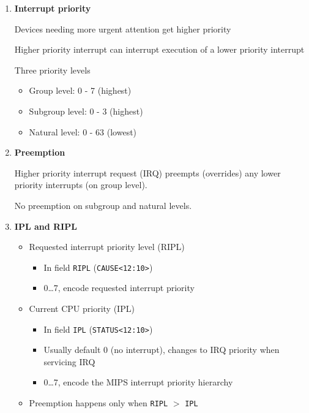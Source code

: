 \documentclass[a4paper]{article}
\begin{document}
\begin{enumerate}[label = \arabic*.]
    \item \textbf{Interrupt priority}
      \par Devices needing more urgent attention get higher priority
      \par Higher priority interrupt can interrupt execution of a lower priority interrupt

      \par Three priority levels
      \begin{itemize}[leftmargin = 1cm]
        \item Group level: 0 - 7 (highest)
        \item Subgroup level: 0 - 3 (highest)
        \item Natural level: 0 - 63 (lowest)
      \end{itemize}

    \item \textbf{Preemption}
      \par Higher priority interrupt request (IRQ) preempts (overrides) any lower priority interrupts (on group level).
      \par No preemption on subgroup and natural levels.

    \item \textbf{IPL and RIPL}
      \begin{itemize}[leftmargin = 1cm]
        \item Requested interrupt priority level (RIPL)
          \begin{itemize}[leftmargin = 1cm]
            \item In field \verb|RIPL| (\verb|CAUSE<12:10>|)
            \item 0\ldots 7, encode requested interrupt priority
          \end{itemize}
        \item Current CPU priority (IPL)
          \begin{itemize}[leftmargin = 1cm]
            \item In field \verb|IPL| (\verb|STATUS<12:10>|)
            \item Usually default 0 (no interrupt), changes to IRQ priority when servicing IRQ
            \item 0\ldots 7, encode the MIPS interrupt priority hierarchy
          \end{itemize}
        \item Preemption happens only when \verb|RIPL| \( > \) \verb|IPL|
      \end{itemize}


\end{enumerate}
\end{document}
